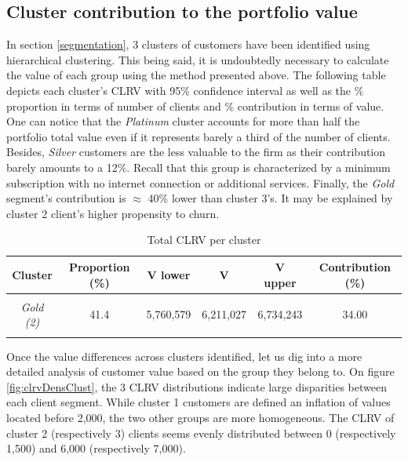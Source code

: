 \documentclass[
]{book}
\begin{document}
\hypertarget{cluster-contribution-to-the-portfolio-value}{%
\subsection{Cluster contribution to the portfolio value}\label{cluster-contribution-to-the-portfolio-value}}

In section \ref{segmentation}, 3 clusters of customers have been identified using hierarchical clustering. This being said, it is undoubtedly necessary to calculate the value of each group using the method presented above. The following table depicts each cluster's CLRV with 95\% confidence interval as well as the \% proportion in terms of number of clients and \% contribution in terms of value. One can notice that the \emph{Platinum} cluster accounts for more than half the portfolio total value even if it represents barely a third of the number of clients. Besides, \emph{Silver} customers are the less valuable to the firm as their contribution barely amounts to a 12\%. Recall that this group is characterized by a minimum subscription with no internet connection or additional services. Finally, the \emph{Gold} segment's contribution is \(\approx\) 40\% lower than cluster 3's. It may be explained by cluster 2 client's higher propensity to churn.

\begin{table}[H]

\caption{\label{tab:totValclust}Total CLRV per cluster}
\centering
\begin{tabular}[t]{>{}cccccc}
\toprule
Cluster & Proportion (\%) & V lower & V & V upper & Contribution (\%)\\
\midrule
\em{\cellcolor{gray!6}{Silver (1)}} & \cellcolor{gray!6}{26.6} & \cellcolor{gray!6}{2,035,928} & \cellcolor{gray!6}{2,117,932} & \cellcolor{gray!6}{2,213,746} & \cellcolor{gray!6}{11.59}\\
\em{Gold (2)} & 41.4 & 5,760,579 & 6,211,027 & 6,734,243 & 34.00\\
\em{\cellcolor{gray!6}{Platinum (3)}} & \cellcolor{gray!6}{32.1} & \cellcolor{gray!6}{9,807,637} & \cellcolor{gray!6}{9,941,041} & \cellcolor{gray!6}{10,083,660} & \cellcolor{gray!6}{54.41}\\
\bottomrule
\end{tabular}
\end{table}

Once the value differences across clusters identified, let us dig into a more detailed analysis of customer value based on the group they belong to. On figure \ref{fig:clrvDensClust}, the 3 CLRV distributions indicate large disparities between each client segment. While cluster 1 customers are defined an inflation of values located before 2,000, the two other groups are more homogeneous. The CLRV of cluster 2 (respectively 3) clients seems evenly distributed between 0 (respectively 1,500) and 6,000 (respectively 7,000).
\end{document}
